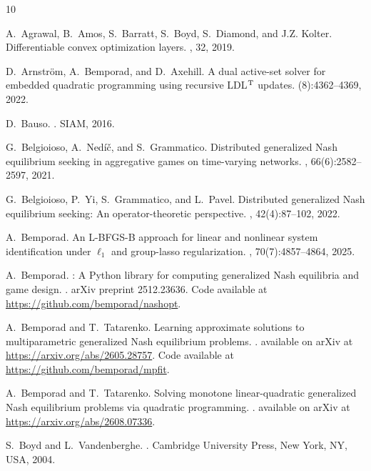 \documentclass[11pt, a4paper]{article}
\theoremstyle{remark}
\theoremstyle{plain}
\begin{document}
\begin{thebibliography}{10}

A.~Agrawal, B.~Amos, S.~Barratt, S.~Boyd, S.~Diamond, and J.Z. Kolter.
\newblock Differentiable convex optimization layers.
, 32, 2019.

D.~Arnstr\"{o}m, A.~Bemporad, and D.~Axehill.
\newblock A dual active-set solver for embedded quadratic programming using recursive {LDL$^{\rm T}$} updates.
(8):4362--4369, 2022.

D.~Bauso.
.
\newblock SIAM, 2016.

G.~Belgioioso, A.~Ned\'i\v{c}, and S.~Grammatico.
\newblock Distributed generalized {Nash} equilibrium seeking in aggregative games on time-varying networks.
, 66(6):2582--2597, 2021.

G.~Belgioioso, P.~Yi, S.~Grammatico, and L.~Pavel.
\newblock Distributed generalized {N}ash equilibrium seeking: An operator-theoretic perspective.
, 42(4):87--102, 2022.

A.~Bemporad.
\newblock An {L-BFGS-B} approach for linear and nonlinear system identification under $\ell_1$ and group-lasso regularization.
, 70(7):4857--4864, 2025.

A.~Bemporad.
: A {Python} library for computing generalized {Nash} equilibria and game design.
.
\newblock arXiv preprint 2512.23636. Code available at \url{https://github.com/bemporad/nashopt}.

A.~Bemporad and T.~Tatarenko.
\newblock Learning approximate solutions to multiparametric generalized {Nash} equilibrium problems.
.
\newblock available on arXiv at \url{https://arxiv.org/abs/2605.28757}. Code available at \url{https://github.com/bemporad/mpfit}.

A.~Bemporad and T.~Tatarenko.
\newblock Solving monotone linear-quadratic generalized {Nash} equilibrium problems via quadratic programming.
.
\newblock available on arXiv at \url{https://arxiv.org/abs/2608.07336}.

S.~Boyd and L.~Vandenberghe.
.
\newblock Cambridge University Press, New York, NY, USA, 2004.


\end{thebibliography}
\end{document}
